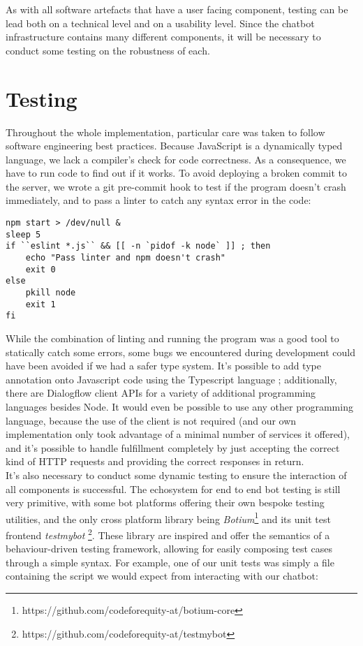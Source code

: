 As with all software artefacts that have a user facing component, testing can be lead both on a technical level and on a usability level. Since the chatbot infrastructure contains many different components, it will be necessary to conduct some testing on the robustness of each.
\section{Testing}
Throughout the whole implementation, particular care was taken to follow software engineering best practices. Because JavaScript is a dynamically typed language, we lack a compiler's check for code correctness. As a consequence, we have to run code to find out if it works. To avoid deploying a broken commit to the server, we wrote a git pre-commit hook to test if the program doesn't crash immediately, and to pass a linter to catch any syntax error in the code:
\begin{lstlisting}
npm start > /dev/null &
sleep 5
if ``eslint *.js`` && [[ -n `pidof -k node` ]] ; then
    echo "Pass linter and npm doesn't crash"
    exit 0
else
    pkill node
    exit 1
fi
\end{lstlisting}
While the combination of linting and running the program was a good tool to statically catch some errors, some bugs we encountered during development could have been avoided if we had a safer type system. It's possible to add type annotation onto Javascript code using the Typescript language \cite{typescript}; additionally, there are Dialogflow client APIs for a variety of additional programming languages besides Node. It would even be possible to use any other programming language, because the use of the client is not required (and our own implementation only took advantage of a minimal number of services it offered), and it's possible to handle fulfillment completely by just accepting the correct kind of HTTP requests and providing the correct responses in return. \\
It's also necessary to conduct some dynamic testing to ensure the interaction of all components is successful. The echosystem for end to end bot testing is still very primitive, with some bot platforms offering their own bespoke testing utilities, and the only cross platform library being \textit{Botium}\footnote{https://github.com/codeforequity-at/botium-core} and its unit test frontend \textit{testmybot} \footnote{https://github.com/codeforequity-at/testmybot}. These library are inspired and offer the semantics of a behaviour-driven testing framework, allowing for easily composing test cases through a simple syntax. For example, one of our unit tests was simply a file containing the script we would expect from interacting with our chatbot:
